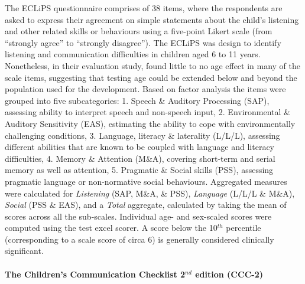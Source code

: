 \documentclass[a4paper, twoside]{templates/ociamthesis}
\begin{document}
\hfill\break
The ECLiPS questionnaire \autocite{Barry2014} comprises of 38 items, where the respondents are asked to express their agreement on simple statements about the child's listening and other related skills or behaviours using a five-point Likert scale (from ``strongly agree'' to ``strongly disagree''). The ECLiPS was design to identify listening and communication difficulties in children aged 6 to 11 years. Nonetheless, in their evaluation study, \textcite{Barry2014} found little to no age effect in many of the scale items, suggesting that testing age could be extended below and beyond the population used for the development. Based on factor analysis the items were grouped into five subcategories: 1. Speech \& Auditory Processing (SAP), assessing ability to interpret speech and non-speech input, 2. Environmental \& Auditory Sensitivity (EAS), estimating the ability to cope with environmentally challenging conditions, 3. Language, literacy \& laterality (L/L/L), assessing different abilities that are known to be coupled with language and literacy difficulties, 4. Memory \& Attention (M\&A), covering short-term and serial memory as well as attention, 5. Pragmatic \& Social skills (PSS), assessing pragmatic language or non-normative social behaviours. Aggregated measures were calculated for \emph{Listening} (SAP, M\&A, \& PSS), \emph{Language} (L/L/L \& M\&A), \emph{Social} (PSS \& EAS), and a \emph{Total} aggregate, calculated by taking the mean of scores across all the sub-scales. Individual age- and sex-scaled scores were computed using the test excel scorer. A score below the 10\(^{th}\) percentile (corresponding to a scale score of circa 6) is generally considered clinically significant.\\

\hypertarget{the-childrens-communication-checklist-2nd-edition-ccc-2}{%
\paragraph{\texorpdfstring{The Children's Communication Checklist 2\(^{nd}\) edition (CCC-2)}{The Children's Communication Checklist 2\^{}\{nd\} edition (CCC-2)}}\label{the-childrens-communication-checklist-2nd-edition-ccc-2}}
\end{document}
